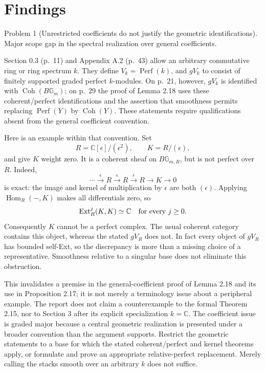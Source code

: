 \documentclass[10pt]{article}
\begin{document}
\section*{Findings}
Problem 1 (Unrestricted coefficients do not justify the geometric identifications).  Major scope gap in the spectral realization over general coefficients.\par
Section 0.3 (p. 11) and Appendix A.2 (p. 43) allow an arbitrary commutative ring or ring spectrum \(k\). They define \(V_k=\operatorname{Perf}(k)\), and \(gV_k\) to consist of finitely supported graded perfect \(k\)-modules. On p. 21, however, \(gV_k\) is identified with \(\operatorname{Coh}(B\mathbb G_m)\); on p. 29 the proof of Lemma 2.18 uses these coherent/perfect identifications and the assertion that smoothness permits replacing \(\operatorname{Perf}(Y)\) by \(\operatorname{Coh}(Y)\). These statements require qualifications absent from the general coefficient convention.\par
Here is an example within that convention. Set \[R=\mathbb C[\epsilon]/(\epsilon^2),\qquad K=R/(\epsilon),\] and give \(K\) weight zero. It is a coherent sheaf on \(B\mathbb G_{m,R}\), but is not perfect over \(R\). Indeed, \[\cdots \xrightarrow{\epsilon}R\xrightarrow{\epsilon}R
          \xrightarrow{\epsilon}R\longrightarrow K\longrightarrow0\] is exact: the image and kernel of multiplication by \(\epsilon\) are both \((\epsilon)\). Applying \(\operatorname{Hom}_R(-,K)\) makes all differentials zero, so \[\operatorname{Ext}^j_R(K,K)\simeq\mathbb C
                  \quad\hbox{for every }j\geq0.\] Consequently \(K\) cannot be a perfect complex. The usual coherent category contains this object, whereas the stated \(gV_R\) does not. In fact every object of \(gV_R\) has bounded self-Ext, so the discrepancy is more than a missing choice of a representative. Smoothness relative to a singular base does not eliminate this obstruction.\par
This invalidates a premise in the general-coefficient proof of Lemma 2.18 and its use in Proposition 2.17; it is not merely a terminology issue about a peripheral example. The report does not claim a counterexample to the formal Theorem 2.15, nor to Section 3 after its explicit specialization \(k=\mathbb C\). The coefficient issue is graded major because a central geometric realization is presented under a broader convention than the argument supports. Restrict the geometric statements to a base for which the stated coherent/perfect and kernel theorems apply, or formulate and prove an appropriate relative-perfect replacement. Merely calling the stacks smooth over an arbitrary \(k\) does not suffice.\par
\end{document}

